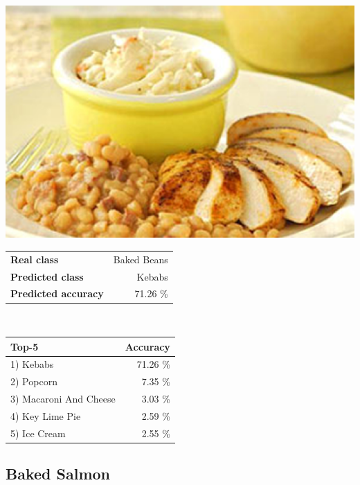 \begin{minipage}[t]{0.4\textwidth}
	\vspace{0pt}
	\includegraphics[width=\linewidth]{images/evaluation-images/baked_beans/baked-beans116.png}
\end{minipage}
\hfill
\begin{minipage}[t]{0.5\textwidth}
	\vspace{0pt}\raggedright
	\begin{tabularx}{\textwidth}{X r}
		\small \textbf{Real class} & \small Baked Beans\\
		\small \textbf{Predicted class} & \small Kebabs\\
		\small \textbf{Predicted accuracy} & \small 71.26 \%
    \end{tabularx}\\
    
    \vspace{6pt}
	\begin{tabularx}{\textwidth}{X r}
        \small \textbf{Top-5} & \small \textbf{Accuracy} \\
        \hline
		\small 1) Kebabs & \small 71.26 \%\\\small 2) Popcorn & \small 7.35 \%\\\small 3) Macaroni And Cheese & \small 3.03 \%\\\small 4) Key Lime Pie & \small 2.59 \%\\\small 5) Ice Cream & \small 2.55 \%
    \end{tabularx}
\end{minipage}
    
\subsection{Baked Salmon}
    
